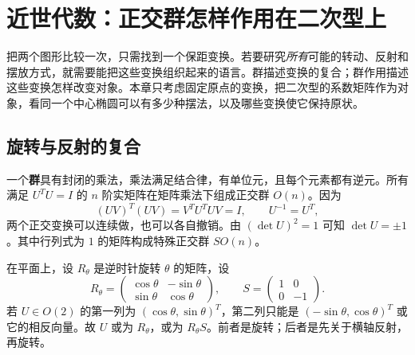 \chapter{近世代数：正交群怎样作用在二次型上}
\label{chap:abstract}

把两个图形比较一次，只需找到一个保距变换。若要研究\emph{所有}可能的转动、反射和摆放方式，就需要能把这些变换组织起来的语言。群描述变换的复合；群作用描述这些变换怎样改变对象。本章只考虑固定原点的变换，把二次型的系数矩阵作为对象，看同一个中心椭圆可以有多少种摆法，以及哪些变换使它保持原状。

\section{旋转与反射的复合}
一个\textbf{群}具有封闭的乘法，乘法满足结合律，有单位元，且每个元素都有逆元。所有满足 \(U^TU=I\) 的 \(n\) 阶实矩阵在矩阵乘法下组成正交群 \(O(n)\)。因为
\[
 (UV)^T(UV)=V^TU^TUV=I,\qquad U^{-1}=U^T,
\]
两个正交变换可以连续做，也可以各自撤销。由 \((\det U)^2=1\) 可知 \(\det U=\pm1\)。其中行列式为 \(1\) 的矩阵构成特殊正交群 \(SO(n)\)。

在平面上，设 \(R_\theta\) 是逆时针旋转 \(\theta\) 的矩阵，设
\[
 R_\theta=\begin{pmatrix}\cos\theta&-\sin\theta\\
 \sin\theta&\cos\theta\end{pmatrix},\qquad
 S=\begin{pmatrix}1&0\\0&-1\end{pmatrix}.
\]
若 \(U\in O(2)\) 的第一列为 \((\cos\theta,\sin\theta)^T\)，第二列只能是 \((-\sin\theta,\cos\theta)^T\) 或它的相反向量。故 \(U\) 或为 \(R_\theta\)，或为 \(R_\theta S\)。前者是旋转；后者是先关于横轴反射，再旋转。

